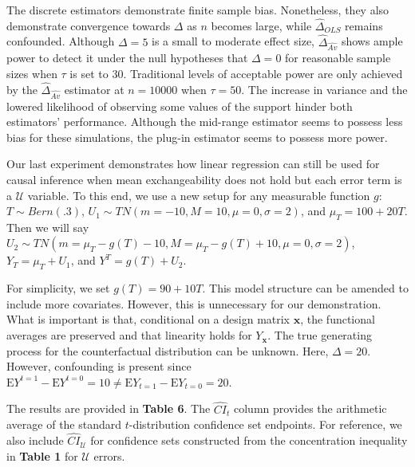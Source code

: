 \documentclass[12pt]{amsart}
\theoremstyle{plain}%
\theoremstyle{definition}
\theoremstyle{remark}
\numberwithin{equation}{section}
\begin{document}
The discrete estimators demonstrate finite sample bias. Nonetheless, they also demonstrate convergence towards $\Delta$ as $n$ becomes large, while $\hat{\Delta}_{OLS}$ remains confounded. Although $\Delta=5$ is a small to moderate effect size, $\hat{\Delta}_{\hat{Av}}$ shows ample power to detect it under the null hypotheses that $\Delta = 0$ for reasonable sample sizes when $\tau$ is set to $30$. Traditional levels of acceptable power are only achieved by the $\hat{\Delta}_{\hat{Av}}$ estimator at $n=10000$ when $\tau = 50$. The increase in variance and the lowered likelihood of observing some values of the support hinder both estimators' performance. Although the mid-range estimator seems to possess less bias for these simulations, the plug-in estimator seems to possess more power.

Our last experiment demonstrates how linear regression can still be used for causal inference when mean exchangeability does not hold but each error term is a $\mathcal{U}$ variable. To this end, we use a new setup for any measurable function $g$: $T \sim Bern(.3)$, $U_1 \sim TN(m=-10, M=10, \mu=0, \sigma =2)$, and $\mu_T = 100 + 20T$. Then we will say $U_2 \sim TN(m= \mu_T - g(T)-10, M= \mu_T - g(T) + 10, \mu = 0, \sigma = 2)$, $Y_T = \mu_T + U_1$, and $Y^T = g(T) + U_2$.

For simplicity, we set $g(T) = 90 + 10T$. This model structure can be amended to include more covariates. However, this is unnecessary for our demonstration. What is important is that, conditional on a design matrix $\mathbf{x}$, the functional averages are preserved and that linearity holds for $Y_{\mathbf{x}}$. The true generating process for the counterfactual distribution can be unknown. Here, $\Delta = 20$. However, confounding is present since $\text{E}Y^{t=1} - \text{E}Y^{t=0} = 10 \neq \text{E}Y_{t=1} - \text{E}Y_{t=0} = 20$.

The results are provided in \textbf{Table 6}. The $\hat{CI}_t$ column provides the arithmetic average of the standard $t$-distribution confidence set endpoints. For reference, we also include $\hat{CI}_{\mathcal{U}}$ for confidence sets constructed from the concentration inequality in \textbf{Table 1} for $\mathcal{U}$ errors.
\end{document}
